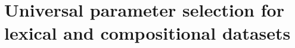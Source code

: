 \section{Universal parameter selection for lexical and compositional datasets}
\label{sec:universal-param-selection}






